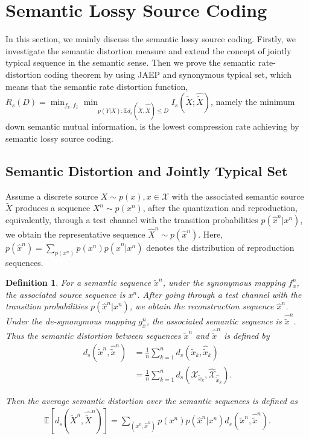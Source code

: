 \documentclass[12pt, draftclsnofoot,onecolumn]{IEEEtran}
\newtheorem{definition}{\bf{Definition}}
\begin{document}
\section{Semantic Lossy Source Coding}
\label{section_VIII}
In this section, we mainly discuss the semantic lossy source coding. Firstly, we investigate the semantic distortion measure and extend the concept of jointly typical sequence in the semantic sense. Then we prove the semantic rate-distortion coding theorem by using JAEP and synonymous typical set, which means that the semantic rate distortion function, $R_s(D)=\min_{f_x,f_{\hat{x}}}\min_{p(Y|X): \mathbb{E}d_s(\tilde{X},\hat{\tilde{X}})\leq D}I_s(\tilde{X};\hat{\tilde{X}})$, namely the minimum down semantic mutual information, is the lowest compression rate achieving by semantic lossy source coding.

\subsection{Semantic Distortion and Jointly Typical Set}
Assume a discrete source $X\sim p(x), x\in\mathcal{X}$ with the associated semantic source $\tilde{X}$ produces a sequence $X^n\sim p(x^n)$, after the quantization and reproduction, equivalently, through a test channel with the transition probabilities $p(\hat{x}^n|x^n)$, we obtain the representative sequence $\hat{X}^n\sim p(\hat{x}^n)$. Here, $p(\hat{x}^n)=\sum_{p(x^n)}p(x^n)p(\hat{x}^n|x^n)$ denotes the distribution of reproduction sequences.

\begin{definition}
For a semantic sequence $\tilde{x}^n$, under the synonymous mapping $f_{x}^n$, the associated source sequence is $x^n$. After going through a test channel with the transition probabilities $p(\hat{x}^n|x^n)$, we obtain the reconstruction sequence $\hat{x}^n$. Under the de-synonymous mapping $g_{\hat{x}}^n$, the associated semantic sequence is $\hat{\tilde{x}}^n$. Thus the semantic distortion between sequences $\tilde{x}^n$ and $\hat{\tilde{x}}^n$ is defined by
\begin{equation}
\begin{aligned}
d_s(\tilde{x}^n,\hat{\tilde{x}}^n)&=\frac{1}{n}\sum_{k=1}^{n}d_s(\tilde{x}_k,\hat{\tilde{x}}_k)\\
                                                  &=\frac{1}{n}\sum_{k=1}^{n}d_s(\mathcal{X}_{\tilde{x}_k},\hat{\mathcal{X}}_{\hat{\tilde{x}}_k}).
\end{aligned}
\end{equation}

Then the average semantic distortion over the semantic sequences is defined as
\begin{equation}
\begin{aligned}
\mathbb{E}\left[d_s (\tilde{X}^n,\hat{\tilde{X}}^n)\right]=\sum_{(x^n,\hat{x}^n)}p\left(x^n\right)p(\hat{x}^n|x^n)d_s(\tilde{x}^n,\hat{\tilde{x}}^n).
\end{aligned}
\end{equation}
\end{definition}
\end{document}
